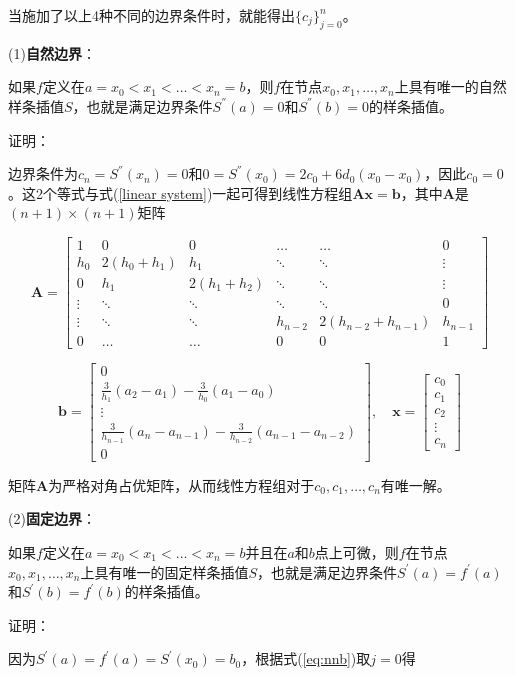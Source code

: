 \documentclass[12pt]{ctexart}
\begin{document}
	当施加了以上4种不同的边界条件时，就能得出$\{c_j\}_{j=0}^n$。
	
	(1)\textbf{自然边界}：
	
	如果$f$定义在$a=x_0<x_1<\dots<x_n=b$，则$f$在节点$x_0,x_1,\dots,x_n$上具有唯一的自然样条插值$S$，也就是满足边界条件$S^{''}(a)=0$和$S^{''}(b)=0$的样条插值。
	
	证明：
	
	边界条件为$c_n=S^{''}(x_n)=0$和$0=S^{''}(x_0)=2c_0+6d_0(x_0-x_0)$，因此$c_0=0$。这2个等式与式(\ref{linear system})一起可得到线性方程组$\mathbf{Ax}=\mathbf{b}$，其中$\mathbf{A}$是$(n+1)\times(n+1)$矩阵
	
	\[
	\mathbf{A}=\begin{bmatrix}
	1&0&0&\dots&\dots&0 \\
	h_0&2(h_0+h_1)&h_1&\ddots&\ddots&\vdots \\
	0&h_1&2(h_1+h_2)&\ddots&\ddots&\vdots \\
	\vdots&\ddots&\ddots&\ddots&\ddots&0 \\
	\vdots&\ddots&\ddots&h_{n-2}&2(h_{n-2}+h_{n-1})&h_{n-1} \\
	0&\dots&\dots&0&0&1
	\end{bmatrix}
	\]
	
	\[
	\mathbf{b}=\begin{bmatrix}
	0 \\
	\frac{3}{h_1}(a_2-a_1)-\frac{3}{h_0}(a_1-a_0) \\
	\vdots \\
	\frac{3}{h_{n-1}}(a_n-a_{n-1})-\frac{3}{h_{n-2}}(a_{n-1}-a_{n-2}) \\
	0
	\end{bmatrix},\quad
	\mathbf{x}=\begin{bmatrix}
	c_0 \\
	c_1 \\
	c_2 \\
	\vdots \\
	c_n
	\end{bmatrix}
	\]
	
	矩阵$\mathbf{A}$为严格对角占优矩阵，从而线性方程组对于$c_0,c_1,\dots,c_n$有唯一解。
	
	(2)\textbf{固定边界}：
	
	如果$f$定义在$a=x_0<x_1<\dots<x_n=b$并且在$a$和$b$点上可微，则$f$在节点$x_0,x_1,\dots,x_n$上具有唯一的固定样条插值$S$，也就是满足边界条件$S^{'}(a)=f^{'}(a)$和$S^{'}(b)=f^{'}(b)$的样条插值。
	
	证明：
	
	因为$S^{'}(a)=f^{'}(a)=S^{'}(x_0)=b_0$，根据式(\ref{eq:nnb})取$j=0$得
	
\end{document}
